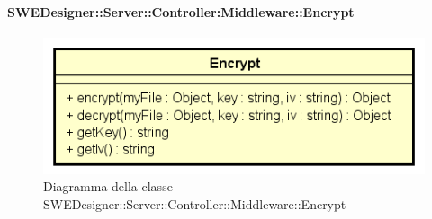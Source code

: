       \paragraph{SWEDesigner::Server::Controller:Middleware::Encrypt}
      	\begin{figure}[h!]
		\centering
		\includegraphics[scale=0.8]{Classi/Encrypt.png}
		\caption{Diagramma della classe SWEDesigner::Server::Controller::Middleware::Encrypt}
 		\end{figure}
